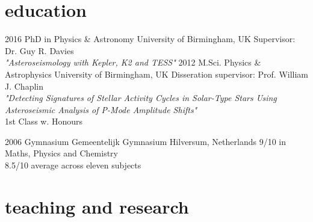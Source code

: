 \documentclass[]{k-cv} %
\begin{document}
\section{education}

\begin{entrylist}
\entry
{2016 }
{PhD {\normalfont in Physics \& Astronomy}}
{University of Birmingham, UK}
{Supervisor: Dr. Guy R. Davies\\
\emph{"Asteroseismology with \textit{Kepler}, K2 and TESS"} \vspace{0.2cm}}
\entry
{2012 }
{M.Sci. {\normalfont Physics \& Astrophysics}}
{University of Birmingham, UK}
{Disseration supervisor: Prof. William J. Chaplin\\
\emph{"Detecting Signatures of Stellar Activity Cycles in Solar-Type Stars Using Asteroseismic Analysis of P-Mode Amplitude Shifts"} \\ 
1st Class w. Honours\vspace{0.2cm}}


\entry
{2006 }
{Gymnasium}
{Gemeentelijk Gymnasium Hilversum, Netherlands}
{9/10 in Maths, Physics and Chemistry\\
8.5/10 average across eleven subjects}
\end{entrylist}


\section{teaching and research}
\end{document}
